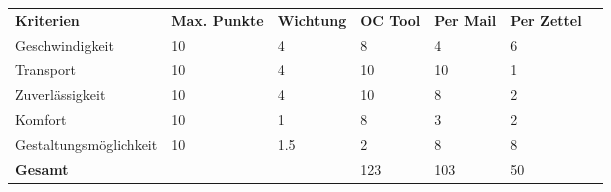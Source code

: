 \begin{tabu}{lllllll}
\rowfont{\bfseries\leavevmode\color{headingfont}}\textbf{Kriterien} & \textbf{Max. Punkte} & \textbf{Wichtung} & \textbf{OC Tool} & \textbf{Per Mail}& \textbf{Per Zettel} \\
Geschwindigkeit & 10 & 4 & 8 & 4 & 6 \\
Transport & 10 & 4 & 10 & 10 & 1 \\
Zuverlässigkeit & 10 & 4 & 10 & 8 & 2 \\
Komfort & 10 & 1 & 8 & 3 & 2 \\
Gestaltungsmöglichkeit & 10 & 1.5 & 2 & 8 & 8 \\
\hline
\hline
{}\textbf{Gesamt} & & & 123 & 103 & 50 \\
\end{tabu}